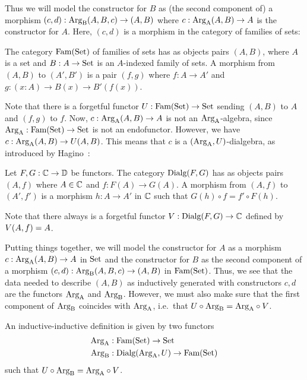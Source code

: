 \documentclass[orivec,envcountsame, ,envcountsect]{llncs}
\begin{document}
Thus we will model the constructor for $B$ as (the second component
of) a morphism $(c, d) : \text{Arg}_{\text{B}}(A, B, c) \to (A, B)$ where $c :
\text{Arg}_{\text{A}}(A, B) \to A$ is the constructor for $A$. Here, $(c, d)$ is a
morphism in the category of families of sets:

\begin{definition}
  The category $\text{Fam}(\text{Set})$ of families of sets has as objects pairs $(A,
  B)$, where $A$ is a set and $B : A \to \text{Set}$ is an $A$-indexed family
  of sets. A morphism from $(A, B)$ to $(A', B')$ is a pair $(f, g)$
  where $f : A \to A'$ and ${g : (x : A) \to B(x) \to B'(f(x))}$.
\end{definition}
Note that there is a forgetful functor $U : \text{Fam}(\text{Set}) \to \text{Set}$
sending $(A, B)$ to $A$ and $(f, g)$ to $f$.
Now, $c : \text{Arg}_{\text{A}}(A, B) \to A$ is not an $\text{Arg}_{\text{A}}$-algebra,
since $\text{Arg}_{\text{A}} : \text{Fam}(\text{Set}) \to \text{Set}$ is not an endofunctor. However, we have $c :
\text{Arg}_{\text{A}}(A, B) \to U(A, B)$. This means that $c$ is a $(\text{Arg}_{\text{A}},
U)$-dialgebra, as introduced by Hagino~\cite{hagino1987phdthesis}:

\begin{definition}
  Let $F, G : \mathbb{C} \to \mathbb{D}$ be functors. The category $\text{Dialg}(F, G)$ has
  as objects pairs $(A, f)$ where $A \in \mathbb{C}$ and $f : F(A) \to
  G(A)$. A morphism from $(A, f)$ to $(A', f')$ is a morphism $h : A
  \to A'$ in $\mathbb{C}$ such that $G(h) \circ f = f' \circ F(h)$.
\end{definition}
Note that there always is a forgetful functor $V : \text{Dialg}(F, G) \to \mathbb{C}$
defined by $V(A, f) = A$.

Putting things together, we will model the constructor for $A$ as a
morphism $c : \text{Arg}_{\text{A}}(A, B) \to A$ in $\text{Set}$ and the constructor for $B$
as the second component of a morphism $(c, d) : \text{Arg}_{\text{B}}(A, B, c) \to (A,
B)$ in $\text{Fam}(\text{Set})$. Thus, we see that the data needed to describe $(A,
B)$ as inductively generated with constructors $c, d$ are
the functors $\text{Arg}_{\text{A}}$ and $\text{Arg}_{\text{B}}$. However, we must also make sure that
the first component of $\text{Arg}_{\text{B}}$ coincides with $\text{Arg}_{\text{A}}$, i.e.\ that
$U \circ \text{Arg}_{\text{B}} = \text{Arg}_{\text{A}} \circ V$. %
\begin{definition} \label{def:indind-functors}
  An inductive-inductive definition is given by two functors
  \begin{align*}
    \text{Arg}_{\text{A}} &: \text{Fam}(\text{Set}) \to \text{Set} \\
    \text{Arg}_{\text{B}} &: \text{Dialg}(\text{Arg}_{\text{A}}, U) \to \text{Fam}(\text{Set})
  \end{align*}
  such that $U \circ \text{Arg}_{\text{B}} = \text{Arg}_{\text{A}} \circ V$.
\end{definition}
\end{document}
